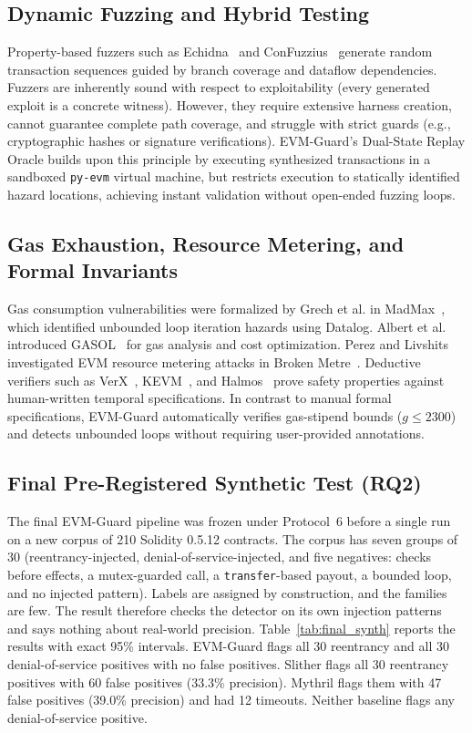 \documentclass[conference]{IEEEtran}
\begin{document}
\subsection{Dynamic Fuzzing and Hybrid Testing}
Property-based fuzzers such as Echidna~\cite{grieco2020echidna} and ConFuzzius~\cite{torres2021confuzzius} generate random transaction sequences guided by branch coverage and dataflow dependencies. Fuzzers are inherently sound with respect to exploitability (every generated exploit is a concrete witness). However, they require extensive harness creation, cannot guarantee complete path coverage, and struggle with strict guards (e.g., cryptographic hashes or signature verifications). EVM-Guard's Dual-State Replay Oracle builds upon this principle by executing synthesized transactions in a sandboxed \texttt{py-evm} virtual machine, but restricts execution to statically identified hazard locations, achieving instant validation without open-ended fuzzing loops.

\subsection{Gas Exhaustion, Resource Metering, and Formal Invariants}
Gas consumption vulnerabilities were formalized by Grech et al. in MadMax~\cite{grech2018madmax}, which identified unbounded loop iteration hazards using Datalog. Albert et al. introduced GASOL~\cite{albert2020gasol} for gas analysis and cost optimization. Perez and Livshits investigated EVM resource metering attacks in Broken Metre~\cite{perez2021broken}. Deductive verifiers such as VerX~\cite{permenev2020verx}, KEVM~\cite{hildenbrandt2018kevm}, and Halmos~\cite{a16z2023halmos} prove safety properties against human-written temporal specifications. In contrast to manual formal specifications, EVM-Guard automatically verifies gas-stipend bounds ($g \le 2300$) and detects unbounded loops without requiring user-provided annotations.

\subsection{Final Pre-Registered Synthetic Test (RQ2)}\label{sec:eval:final}
The final EVM-Guard pipeline was frozen under Protocol~6 before a single run on a new corpus of 210 Solidity 0.5.12 contracts. The corpus has seven groups of 30 (reentrancy-injected, denial-of-service-injected, and five negatives: checks before effects, a mutex-guarded call, a \texttt{transfer}-based payout, a bounded loop, and no injected pattern). Labels are assigned by construction, and the families are few. The result therefore checks the detector on its own injection patterns and says nothing about real-world precision. Table~\ref{tab:final_synth} reports the results with exact 95\% intervals. EVM-Guard flags all 30 reentrancy and all 30 denial-of-service positives with no false positives. Slither flags all 30 reentrancy positives with 60 false positives (33.3\% precision). Mythril flags them with 47 false positives (39.0\% precision) and had 12 timeouts. Neither baseline flags any denial-of-service positive.
\end{document}

